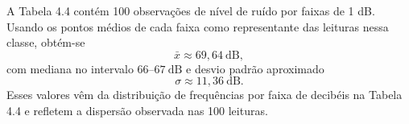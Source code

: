 A Tabela 4.4 contém 100 observações de nível de ruído por faixas de 1 dB. Usando os pontos médios de cada faixa como representante das leituras nessa classe, obtém-se
\[
\bar{x}\approx69{,}64\ \text{dB},
\]
com mediana no intervalo $66\text{–}67\ \text{dB}$ e desvio padrão aproximado
\[
\sigma \approx 11{,}36\ \text{dB}.
\]
Esses valores vêm da distribuição de frequências por faixa de decibéis na Tabela 4.4 e refletem a dispersão observada nas 100 leituras.  